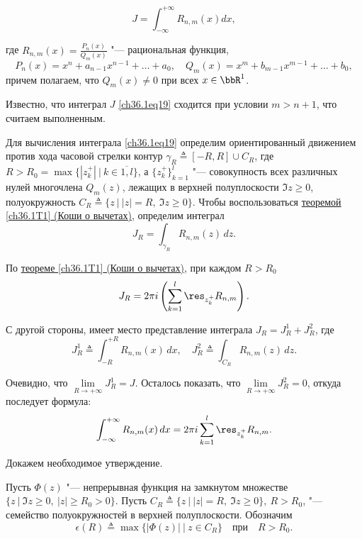 \begin{leftbar}
\begin{equation} \label{ch36.1eq19}
J = \int_{-\infty}^{+\infty} R_{n,m} (x) dx,
\end{equation}

где $R_{n,m}(x) = \frac{P_n(x)}{Q_m(x)}$ "--- рациональная функция,
$$
P_n(x) = x^n + a_{n - 1} x^{n - 1} + \ldots + a_0, \quad
Q_m(x) = x^m + b_{m - 1} x^{m - 1} + \ldots + b_0,
$$
причем полагаем, что $Q_m(x) \not= 0$ при всех $x \in \bbR^1$.

Известно, что интеграл $J$ \eqref{ch36.1eq19} сходится при условии $m > n + 1$, что считаем выполненным.

Для вычисления интеграла \eqref{ch36.1eq19} определим ориентированный движением против хода часовой стрелки контур $\gamma_R \triangleq [-R, R] \cup C_R$, где $R > R_0 = \max\{ |z_k^{+}| \: \big| \: k \in \overline{1,l} \}$, а $ \{ z_{k}^{+} \}^l_{k = 1}$ "--- совокупность всех различных нулей многочлена $Q_m(z)$, лежащих в верхней полуплоскости $\Im z \ge 0$, полуокружность $C_R \triangleq \{ z \: \big| \: |z| = R, \: \Im z \ge 0 \}$. Чтобы воспользоваться \hyperref[ch36.1T1]{теоремой \ref{ch36.1T1} (Коши о вычетах)}, определим интеграл 
$$
J_R = \int_{\gamma_R} R_{n,m}(z)\,dz.
$$

По \hyperref[ch36.1T1]{теореме \ref{ch36.1T1} (Коши о вычетах)}, при каждом $R > R_0$
$$
J_R = 2\pi i\left( \sum_{k = 1}^{l} \res_{z_k^+} R_{n,m}\right).
$$

С другой стороны, имеет место представление интеграла $J_R = J_R^1 + J_R^2$, где 
\begin{equation} \label{ch36.1eq20}
J_R^1 \triangleq \int_{-R}^{+R} R_{n,m}(x)\,dx, \quad J_R^2 \triangleq \int_{C_R} R_{n,m}(z)\,dz.
\end{equation}

Очевидно, что $\lim\limits_{R \to +\infty} J_R^1 = J$. Осталось показать, что $\lim\limits_{R \to +\infty}J_R^2 = 0$, откуда последует формула:
\begin{equation} \label{ch36.1eq21}
\int_{-\infty}^{+\infty}R_{n,m}(x)\,dx = 2\pi i\sum_{k = 1}^{l} \res_{z_k^+} R_{n,m}.
\end{equation}

Докажем необходимое утверждение.

\begin{lemm} \label{ch36.1lemm4}
Пусть $\Phi(z)$ "--- непрерывная функция на замкнутом множестве $\{ z \: \big| \: \Im z \ge 0, \: |z| \ge R_0 > 0 \}$. Пусть $C_R \triangleq \{ z \: \big| \: |z| = R, \: \Im z \ge 0 \}, \: R > R_0$, "--- семейство полуокружностей в верхней полуплоскости. Обозначим
$$
\epsilon(R) \triangleq \max\{|\Phi(z)| \: \big| \: z\in C_R \} \quad \text{при} \quad R > R_0.
$$


\end{lemm}
\end{leftbar}

